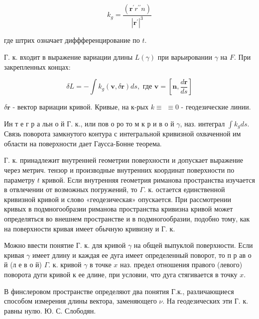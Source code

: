 \documentclass[10pt]{article}
\begin{document}
\[

k_{g}=\frac{\left(\boldsymbol{r}^{\prime} r^{\prime \prime} n\right)}{\left|\boldsymbol{r}^{\prime}\right|^{3}}

\]



где штрих означает диффференцирование по $t$.



Г. к. входит в выражение вариации длины $L(\gamma)$ при варьировании $\gamma$ на $F$. При закрепленных концах:



\[

\delta L=-\int k_{g}(\boldsymbol{v}, \delta \boldsymbol{r}) d s, \text { где } \boldsymbol{v}=\left[\boldsymbol{n}, \frac{d \boldsymbol{r}}{d s}\right]

\]



$\delta \boldsymbol{r}$ - вектор вариации кривой. Кривые, на к-рых $k \equiv$ $\equiv 0$ - геодезические линии.



Ин т е г р а льн о й Г. к., или пов о ро то м к р и в о й $\gamma$, наз. интеграл $\int k_{g} d s$. Связь поворота замкнутого контура с интегральной кривизной охваченной им области на поверхности дает Гаусса-Бонне теорема.



Г. к. принадлежит внутренней геометрии поверхности и допускает выражение через метрич. тензор и производные внутренних координат поверхности по параметру $t$ кривой. Если внутренняя геометрия риманова пространства изучается в отвлечении от возможных погружений, то $\Gamma$. к. остается единственной кривизной кривой и слово «геодезическая» опускается. При рассмотрении кривых в подмногообразии риманова пространства кривизна кривой может определяться во внешнем пространстве и в подмногообразии, подобно тому, как на поверхности кривая имеет обычную кривизну и Г. к.



Можно ввести понятие $Г$. к. для кривой $\gamma$ на общей выпуклой поверхности. Если кривая $\gamma$ имеет длину и каждая ее дуга имеет определенный поворот, то п р ав о й (л е в о й) $\Gamma$. к. кривой $\gamma$ в точке $x$ наз. предел отношения правого (левого) поворота дуги кривой к ее длине, при условии, что дуга стягивается в точку $x$.



В финслеровом пространстве определяют два понятия Г.к., различающиеся способом измерения длины вектора, заменяющего $\nu$. На геодезических эти Г. к. равны нулю. Ю. С. Слободян.
\end{document}
